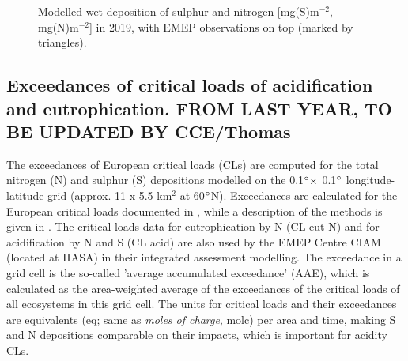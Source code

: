 \begin{figure}[H]
 \caption{Modelled wet deposition of sulphur and nitrogen [mg(S)m$^{-2}$, mg(N)m$^{-2}$] in 2019, with EMEP observations on top (marked by triangles).}
\label{wdeps}
\end{figure}

\subsection{Exceedances of critical loads of acidification and eutrophication. FROM LAST YEAR, TO BE UPDATED BY CCE/Thomas}\label{subs:exceedSnN}

The exceedances of European critical loads (CLs) are computed for the total nitrogen
(N) and sulphur (S) depositions modelled on the 0.1$^\circ \times$ 0.1$^\circ$
longitude-latitude grid (approx. 11 x 5.5 km$^{2}$ at 60$^\circ$N).
Exceedances are calculated for the European critical loads documented in \cite{Hettelingh:2017}, while
a description of the methods is given in \cite{DeVries:2015}. The
critical loads data for eutrophication by N (CL eut N) and for acidification by N and S
(CL acid) are also used by the EMEP Centre CIAM (located at IIASA) in their integrated assessment
modelling. The exceedance in a grid cell is the so-called ’average accumulated
exceedance’ (AAE), which is calculated as the area-weighted average of the
exceedances of the critical loads of all ecosystems in this grid cell. The units for
critical loads and their exceedances are equivalents (eq; same as \textit{moles of charge},
molc) per area and time, making S and N depositions comparable on their impacts, which is important for
acidity CLs.

